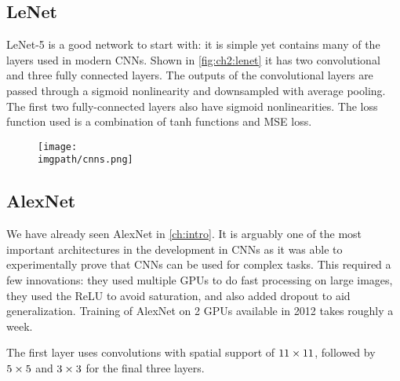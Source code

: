 \subsection{LeNet}
LeNet-5 \cite{lecun_gradient-based_1998} is a good network to start with: it
is simple yet contains many of the layers used in modern CNNs. Shown in
\autoref{fig:ch2:lenet} it has two convolutional and three fully connected
layers. The outputs of the convolutional layers are passed through a sigmoid
nonlinearity and downsampled with average pooling. The first two fully-connected
layers also have sigmoid nonlinearities. The loss function used is a combination
of tanh functions and MSE loss.

\begin{figure}
  \centering
  \texttt{[image: \\imgpath/cnns.png]}
  \label{fig:ch2:lenet}
\end{figure}

\subsection{AlexNet}
We have already seen AlexNet \cite{krizhevsky_imagenet_2012} in \autoref{ch:intro}.
It is arguably one of the most important architectures in the development in CNNs as it
was able to experimentally prove that CNNs can be used for complex tasks. This
required a few innovations: they used multiple GPUs to do fast
processing on large images, they used the ReLU to avoid saturation, and also added dropout
to aid generalization. Training of AlexNet on 2 GPUs available in 2012 takes
roughly a week.

The first layer uses convolutions with spatial support of $11\times11$, followed
by $5\times 5$ and $3\times 3$ for the final three layers.


